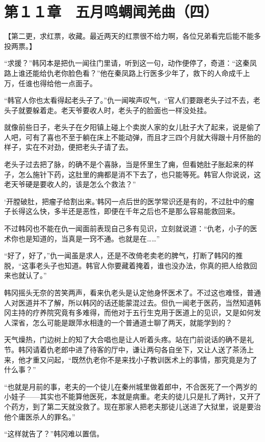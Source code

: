 \section{第１１章　五月鸣蜩闻羌曲（四）}

【第二更，求红票，收藏。最近两天的红票很不给力啊，各位兄弟看完后能不能多投两票。】

“求援？”韩冈本是把仇一闻往门里请，听到这一句，动作便停了，奇道：“这秦凤路上谁还能给仇老你脸色看？”他在秦凤路上行医多少年了，救下的人命成千上万，任谁也得给他一点面子。

“韩官人你也太看得起老头子了。”仇一闻唉声叹气，“官人们要跟老头子过不去，老头子就要躲着走。老天爷要收人时，老头子的脸面也一样没处挂。

就像前些日子，老头子在夕阳镇上碰上个卖炭人家的女儿肚子大了起来，说是偷了人吧，可有了喜也不至于躺在床上不能动弹，而且才三四个月就大得跟十月怀胎的样子，实在不对劲，便把老头子请了去。

老头子过去把了脉，的确不是个喜脉，当是怀里生了痈，但看她肚子胀起来的样子，怎么施针下药，这肚里的痈都是消不下去了，也只能等死。韩官人你说说，这老天爷硬是要收人的，该是怎么个救法？”

‘开膛破肚，把瘤子给割出来。’韩冈一点后世的医学常识还是有的，不过肚中的瘤子长得这么快，多半还是恶性，即便在千年之后也不是那么容易能救回来。

不过韩冈也不能在仇一闻面前表现自己多有见识，立刻就说道：“仇老，小子的医术你也是知道的，当真是一窍不通。也就是在……”

“好了，好了，”仇一闻虽是求人，还是不改倚老卖老的脾气，打断了韩冈的推脱，“这事老头子也知道。韩官人你要藏着掩着，谁也没办法，你真的把人给救回来也就认了。”

韩冈摇头无奈的苦笑两声，看来仇老头是认定他身怀医术了。不过这也难怪，普通人对医道并不了解，所以韩冈的话还能蒙混过去。但仇一闻老于医药，当然知道韩冈主持的疗养院究竟有多难得，而他对于五行生克用于医道上的见识，又是如何发人深省，怎么可能是跟萍水相逢的一个普通道士聊了两天，就能学到的？

天气燥热，门边树上的知了大合唱也是让人听着头疼。站在门前说话的确不是礼节。韩冈请着仇老郎中进了待客的厅中，谦让两句各自坐下，又让人送了茶汤上来，他才重又问起，“既然仇老你不是来找小子教训医术上的事情，那究竟是为了什么事？”

“也就是月前的事，老夫的一个徒儿在秦州城里做着郎中，不合医死了一个两岁的小娃子——其实也不能算他医死，本就是病重。老夫的徒儿只是扎了两针，又开了个药方，到了第二天就没救了。现在那家人把老夫那徒儿送进了大狱里，说是要治他个庸医杀人的罪名。”

“这样就告了？”韩冈难以置信。


